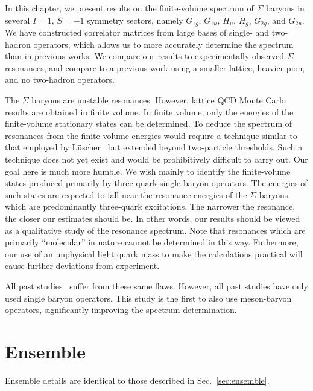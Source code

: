 In this chapter, we present results on the finite-volume spectrum of $\Sigma$ baryons in several $I=1$, $S=-1$ symmetry sectors, namely $G_{1g}$, $G_{1u}$, $H_u$, $H_g$, $G_{2g}$, and $G_{2u}$. We have constructed correlator matrices from large bases of single- and two-hadron operators, which allows us to more accurately determine the spectrum than in previous works. We compare our results to experimentally observed $\Sigma$ resonances, and compare to a previous work using a smaller lattice, heavier pion, and no two-hadron operators.

The $\Sigma$ baryons are unstable resonances. However, lattice QCD Monte Carlo results are obtained in finite volume.  In finite volume, only the energies of the finite-volume stationary states can be determined.  To deduce the spectrum of resonances from the finite-volume energies would require a technique similar to that employed by L\"uscher~\cite{Luscher:1990ck} but extended beyond two-particle thresholds.  Such a technique does not yet exist and would be prohibitively difficult to carry out.  Our goal here is much more humble.  We wish mainly to identify the finite-volume states produced primarily by three-quark single baryon operators.  The energies of such states are expected to fall near the resonance energies of the $\Sigma$ baryons which are predominantly three-quark excitations.  The narrower the resonance, the closer our estimates should be.  In other words, our results should be viewed as a qualitative study of the resonance spectrum.  Note that resonances which are primarily ``molecular'' in nature cannot be determined in this way.  Futhermore, our use of an unphysical light quark mass to make the calculations practical will cause further deviations from experiment.

All past studies~\cite{Edwards:2012fx, Bulava:2009jb, Bulava:2010yg, Edwards:2011jj} suffer from these same flaws.  However, all past studies have only used single baryon operators.  This study is the first to also use meson-baryon operators, significantly improving the spectrum determination.
\section{Ensemble}
Ensemble details are identical to those described in Sec.~\ref{sec:ensemble}.
